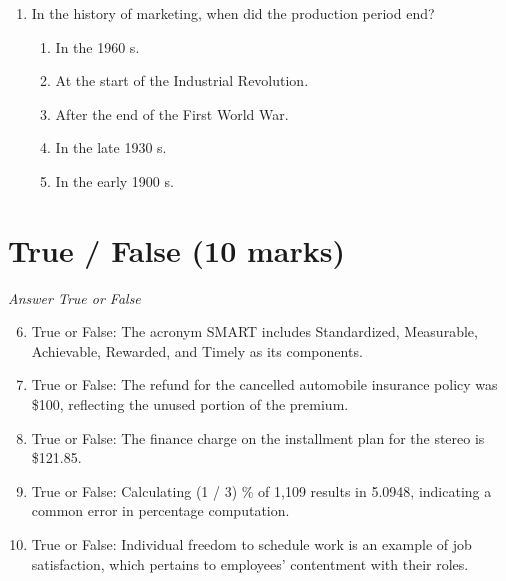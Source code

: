 \documentclass[12pt]{article}
\begin{document}
\begin{enumerate}[label=\arabic*.]
\begin{enumerate}[label=(\alph*)]
    \item Policy 1: $28.00, Policy 2: $491.00, Policy 3: \$117.00
    \item Policy 1: $25.20, Policy 2: $491.40, Policy 3: \$117.60
    \item Policy 1: $52.00, Policy 2: $182.00, Policy 3: \$117.60
\end{enumerate}
\item In the history of marketing, when did the production period end?
\begin{enumerate}[label=(\alph*)]
    \item In the 1960 s.
    \item At the start of the Industrial Revolution.
    \item After the end of the First World War.
    \item In the late 1930 s.
    \item In the early 1900 s.
\end{enumerate}
\end{enumerate}

\section*{True / False (10 marks)}
\textit{Answer True or False}
\begin{enumerate}[label=\arabic*.]
\setcounter{enumi}{5}
\item True or False: The acronym SMART includes Standardized, Measurable, Achievable, Rewarded, and Timely as its components.
\item True or False: The refund for the cancelled automobile insurance policy was \$100, reflecting the unused portion of the premium.
\item True or False: The finance charge on the installment plan for the stereo is \$121.85.
\item True or False: Calculating (1 / 3) \% of 1,109 results in 5.0948, indicating a common error in percentage computation.
\item True or False: Individual freedom to schedule work is an example of job satisfaction, which pertains to employees' contentment with their roles.
\end{enumerate}
\end{document}
